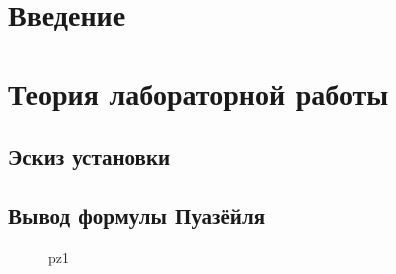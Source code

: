 \documentclass[a4paper,12pt]{article}%
\def\source{/home/lab/tex/templates}
\begin{document}

\tableofcontents
\newpage

\section*{Введение} %
\label{sec:input}

\section{Теория лабораторной работы}

\subsection{Эскиз установки} %
\label{sec:device}

\begin{figure}[H]
	\centering
	
	\label{fig:c}
\end{figure}

\subsection{Вывод формулы Пуазёйля}
    
\begin{figure}[H]
	\centering
	
	\caption{pz1}
	\label{fig:pz1}
\end{figure}
\end{document}
